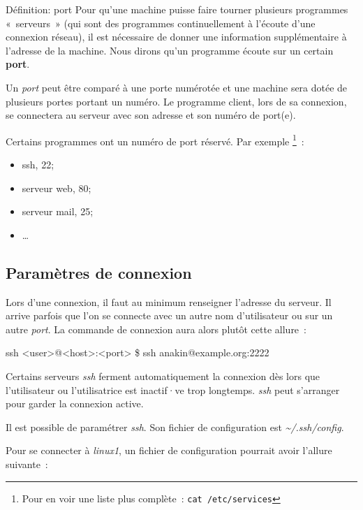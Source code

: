 \documentclass[a4paper,11pt]{article}
\begin{document}
\vspace{10mm}
\begin{coltbox}{Définition: port}
	Pour qu'une machine puisse faire tourner plusieurs programmes «~serveurs~»
	(qui sont des programmes continuellement à l'écoute d'une connexion réseau),
	il est nécessaire de donner une information supplémentaire à l'adresse de la
	machine. Nous dirons qu'un programme écoute sur un certain \textbf{port}. 

	Un \textit{port} peut être comparé à une porte numérotée et une machine sera
	dotée de plusieurs portes portant un numéro. Le programme client, lors de sa
	connexion, se connectera au serveur avec son adresse et son numéro de
	port(e). 

	Certains programmes ont un numéro de port réservé. Par exemple
	\footnote{Pour en voir une liste plus complète~: \texttt{cat /etc/services}}~:
	\begin{itemize}
		\item ssh, 22;
		\item serveur web, 80;
		\item serveur mail, 25;
		\item …
	\end{itemize}
\end{coltbox}

\clearpage
\subsection{Paramètres de connexion}

Lors d'une connexion, il faut au minimum renseigner l'adresse du serveur. Il
arrive parfois que l'on se connecte avec un autre nom d'utilisateur ou sur un
autre \textit{port}. La commande de connexion aura alors plutôt cette allure~:

\begin{term}
	ssh <user>@<host>:<port> 
	\$ ssh anakin@example.org:2222
\end{term}


Certains serveurs \textit{ssh} ferment automatiquement la
connexion dès lors que l'utilisateur ou l'utilisatrice est inactif·ve trop
longtemps. \textit{ssh} peut s'arranger pour garder la connexion active. 

Il est possible de paramétrer \textit{ssh}. Son fichier de configuration est
\textit{\textasciitilde/.ssh/config}. 

Pour se connecter à \textit{linux1}, un fichier de configuration pourrait avoir
l'allure suivante~:
\end{document}
